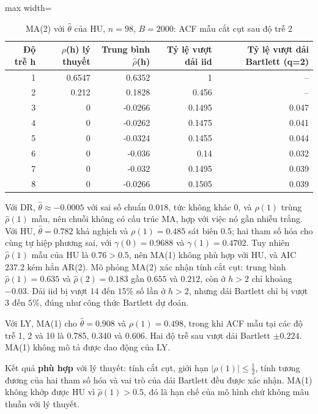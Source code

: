 \begin{table}[H]
\centering\footnotesize
\caption{MA(2) với $\hat\theta$ của HU, $n=98$, $B=2000$: ACF mẫu cắt cụt sau độ trễ 2}\label{tab:tab_b11_09_ma2_simulation}
\begin{adjustbox}{max width=\linewidth}
\begin{tabular}{|r|r|r|r|r|}
\toprule
Độ trễ h & $\rho$(h) lý thuyết & Trung bình $\hat{\rho}$(h) & Tỷ lệ vượt dải iid & Tỷ lệ vượt dải Bartlett (q=2) \\
\midrule
1 & 0.6547 & 0.6352 & 1 & – \\
2 & 0.212 & 0.1828 & 0.456 & – \\
3 & 0 & -0.0266 & 0.1495 & 0.047 \\
4 & 0 & -0.0262 & 0.1475 & 0.041 \\
5 & 0 & -0.0324 & 0.1455 & 0.044 \\
6 & 0 & -0.036 & 0.14 & 0.032 \\
7 & 0 & -0.032 & 0.1495 & 0.039 \\
8 & 0 & -0.0266 & 0.1505 & 0.039 \\
\bottomrule
\end{tabular}
\end{adjustbox}\par{}
\end{table}
 Với DR, $\hat\theta\approx-0.0005$ với sai số chuẩn $0.018$, tức không khác $0$, và $\rho(1)$ trùng $\hat\rho(1)$ mẫu, nên chuỗi không có cấu trúc MA, hợp với việc nó gần nhiễu trắng. Với HU, $\hat\theta=0.782$ khả nghịch và $\rho(1)=0.485$ sát biên $0.5$; hai tham số hóa cho cùng tự hiệp phương sai, với $\gamma(0)=0.9688$ và $\gamma(1)=0.4702$. Tuy nhiên $\hat\rho(1)$ mẫu của HU là $0.76>0.5$, nên MA(1) không phù hợp với HU, và AIC $237.2$ kém hẳn AR(2). Mô phỏng MA(2) xác nhận tính cắt cụt: trung bình $\hat\rho(1)=0.635$ và $\hat\rho(2)=0.183$ gần $0.655$ và $0.212$, còn ở $h>2$ chỉ khoảng $-0.03$. Dải iid bị vượt $14$ đến $15\%$ số lần ở $h>2$, nhưng dải Bartlett chỉ bị vượt $3$ đến $5\%$, đúng như công thức Bartlett dự đoán.

Với LY, MA(1) cho $\hat\theta=0.908$ và $\rho(1)=0.498$, trong khi ACF mẫu tại các độ trễ 1, 2 và 10 là 0.785, 0.340 và 0.606. Hai độ trễ sau vượt dải Bartlett $\pm0.224$. MA(1) không mô tả được dao động của LY.

 Kết quả \textbf{phù hợp} với lý thuyết: tính cắt cụt, giới hạn $|\rho(1)|\le\tfrac12$, tính tương đương của hai tham số hóa và vai trò của dải Bartlett đều được xác nhận. MA(1) không khớp được HU vì $\hat\rho(1)>0.5$, đó là hạn chế của mô hình chứ không mâu thuẫn với lý thuyết.

